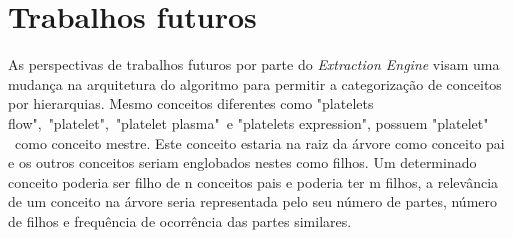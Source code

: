\section{Trabalhos futuros}
As perspectivas de trabalhos futuros por parte do \emph{Extraction Engine} visam uma mudança na arquitetura do algoritmo para permitir a categorização de conceitos por hierarquias. Mesmo conceitos diferentes como "platelets flow",\ "platelet",\ "platelet plasma"\ e "platelets expression", possuem
 "platelet" \ como conceito mestre. Este conceito estaria na raiz da árvore como conceito pai e os outros conceitos seriam englobados nestes como filhos. Um determinado conceito poderia ser filho de n conceitos pais e poderia ter m filhos, a relevância de um conceito na árvore seria representada pelo seu número de partes, número de filhos e frequência de ocorrência das partes similares.
 
